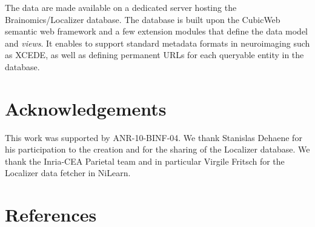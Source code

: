 \documentclass[review]{elsarticle}
\begin{document}
The data are made available on a dedicated server hosting the Brainomics/Localizer database. The database is built upon the CubicWeb semantic web framework and a few extension modules that define the data model and \emph{views}. It enables to support standard metadata formats in neuroimaging such
as XCEDE, as well as defining permanent URLs for each queryable entity in the database.


\section{Acknowledgements}

This work was supported by ANR-10-BINF-04. We thank Stanislas Dehaene for his participation to the creation and for the sharing of the Localizer database. We thank the Inria-CEA Parietal team and in particular Virgile Fritsch for the Localizer data fetcher in NiLearn.


\section*{References}


\end{document}
